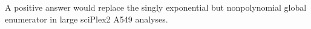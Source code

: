 A positive answer would replace the singly exponential but nonpolynomial global enumerator in large sciPlex2 A549 analyses.